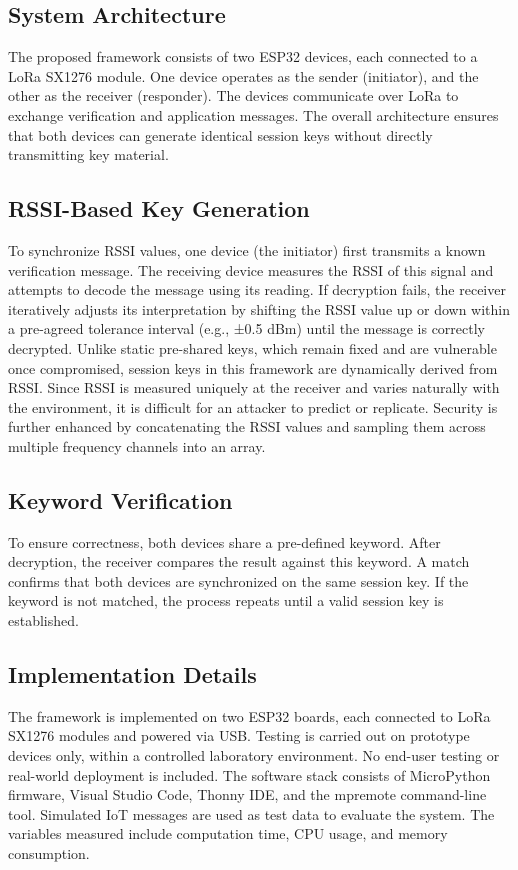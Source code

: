 \subsection{System Architecture}
 The proposed framework consists of two ESP32 devices, each connected to a LoRa SX1276 module. One device operates as the sender (initiator), and the other as the receiver (responder). The devices communicate over LoRa to exchange verification and application messages. The overall architecture ensures that both devices can generate identical session keys without directly transmitting key material.

\subsection{RSSI-Based Key Generation}
To synchronize RSSI values, one device (the initiator) first transmits a known verification message. The receiving device measures the RSSI of this signal and attempts to decode the message using its reading. If decryption fails, the receiver iteratively adjusts its interpretation by shifting the RSSI value up or down within a pre-agreed tolerance interval (e.g., ±0.5 dBm) until the message is correctly decrypted. Unlike static pre-shared keys, which remain fixed and are vulnerable once compromised, session keys in this framework are dynamically derived from RSSI. Since RSSI is measured uniquely at the receiver and varies naturally with the environment, it is difficult for an attacker to predict or replicate. Security is further enhanced by concatenating the RSSI values and sampling them across multiple frequency channels into an array. 

\subsection{Keyword Verification}
To ensure correctness, both devices share a pre-defined keyword. After decryption, the receiver compares the result against this keyword. A match confirms that both devices are synchronized on the same session key. If the keyword is not matched, the process repeats until a valid session key is established.

\subsection{Implementation Details}
The framework is implemented on two ESP32 boards, each connected to LoRa SX1276 modules and powered via USB. Testing is carried out on prototype devices only, within a controlled laboratory environment. No end-user testing or real-world deployment is included.
The software stack consists of MicroPython firmware, Visual Studio Code, Thonny IDE, and the mpremote command-line tool. Simulated IoT messages are used as test data to evaluate the system. The variables measured include computation time, CPU usage, and memory consumption. 
